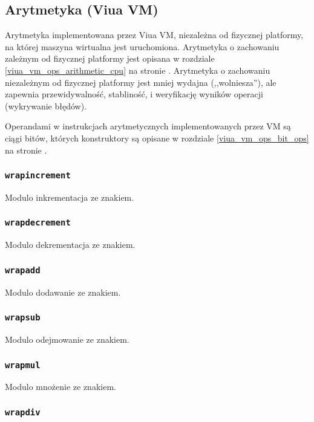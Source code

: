 \subsection{Arytmetyka (Viua VM)}
\label{viua_vm_ops_arithmetic_vm}

Arytmetyka implementowana przez Viua VM, niezależna od fizycznej platformy, na
której maszyna wirtualna jest uruchomiona. Arytmetyka o zachowaniu zależnym od
fizycznej platformy jest opisana w rozdziale \ref{viua_vm_ops_arithmetic_cpu} na
stronie \pageref{viua_vm_ops_arithmetic_cpu}. Arytmetyka o zachowaniu
niezależnym od fizycznej platformy jest mniej wydajna (,,wolniesza''), ale
zapewnia przewidywalność, stabliność, i weryfikację wyników operacji (wykrywanie
błędów).

Operandami w instrukcjach arytmetycznych implementowanych przez VM są ciągi
bitów, których konstruktory są opisane w rozdziale \ref{viua_vm_ops_bit_ops} na
stronie \pageref{viua_vm_ops_bit_ops}.

\subsubsection{\texttt{wrapincrement}}

Modulo inkrementacja ze znakiem.

\subsubsection{\texttt{wrapdecrement}}

Modulo dekrementacja ze znakiem.

\subsubsection{\texttt{wrapadd}}

Modulo dodawanie ze znakiem.

\subsubsection{\texttt{wrapsub}}

Modulo odejmowanie ze znakiem.

\subsubsection{\texttt{wrapmul}}

Modulo mnożenie ze znakiem.

\subsubsection{\texttt{wrapdiv}}


